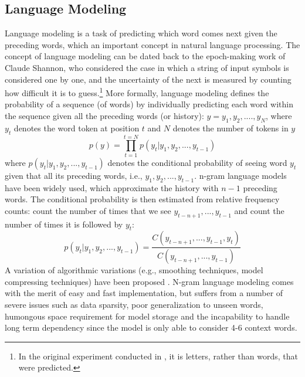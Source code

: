 \subsection{Language Modeling}
Language modeling is a task of predicting which word comes next given the preceding words, which 
an important concept in natural language processing. 
The concept of language modeling can be dated back to the epoch-making work \cite{shannon1951prediction} of Claude Shannon, 
who considered the case
in which a string of input symbols is considered
one by one, and the uncertainty of the next is measured
by counting how difficult it is to guess.\footnote{In the original experiment conducted in \cite{shannon1951prediction}, it is letters, rather than words, that were predicted. } 
More formally, language modeling defines the probability of a sequence (of words)
by individually predicting each word within the sequence given all the preceding words (or history): 
$y=y_1, y_2,...., y_N$, where
  $y_t$ denotes the word token at position $t$ and $N$ denotes the number of tokens in $y$
  \begin{equation}
p(y)=\prod_{t=1}^{t=N} p(y_t|y_1,y_2, ...,y_{t-1})
\label{LM}
\end{equation}
where $p(y_t|y_1,y_2, ...,y_{t-1})$ denotes the conditional probability of seeing word $y_t$ given that all its preceding words, i.e., $y_1,y_2, ...,y_{t-1}$. 
n-gram language models have been widely used, which approximate the history with $n-1$ preceding words. 
The conditional probability is then estimated from relative frequency counts: count the number of times that we see $y_{t-n+1}, ..., y_{t-1}$ and count the number of times 
it is followed by $y_t$:
\begin{equation}
p(y_t|y_1,y_2, ...,y_{t-1})=\frac{C(y_{t-n+1}, ..., y_{t-1},y_t)}{C(y_{t-n+1}, ..., y_{t-1})}
\end{equation}
A variation of  algorithmic variations (e.g., smoothing techniques, model compressing techniques)
 have been proposed  
 \cite{kneser1995improved,rosenfeld2000two,stolcke2002srilm,teh2006hierarchical,federico2008irstlm,federico1996bayesian,chen1996empirical,bacchiani2004language,brants2007large,church2007compressing}. N-gram language modeling comes with the
merit of easy and fast implementation, but suffers from a number of severe issues such as data sparsity, poor generalization to unseen words, 
humongous space requirement for model storage and the incapability to handle long term dependency since the model is only able to consider 4-6  context words. 

